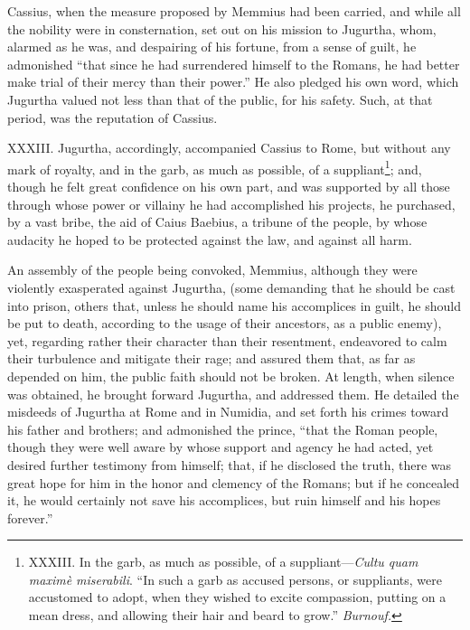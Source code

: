 Cassius, when the measure proposed by Memmius had been carried, and
while all the nobility were in consternation, set out on his mission
to Jugurtha, whom, alarmed as he was, and despairing of his fortune,
from a sense of guilt, he admonished ``that since he had surrendered
himself to the Romans, he had better make trial of their mercy than
their power.'' He also pledged his own word, which Jugurtha valued not
less than that of the public, for his safety. Such, at that period,
was the reputation of Cassius.

XXXIII. Jugurtha, accordingly, accompanied Cassius to Rome, but
without any mark of royalty, and in the garb, as much as possible, of
a suppliant\footnote{XXXIII. In the garb, as much as possible, of a suppliant—\emph{Cultu
quam maximè miserabili}. ``In such a garb as accused persons, or
suppliants, were accustomed to adopt, when they wished to excite
compassion, putting on a mean dress, and allowing their hair and beard
to grow.'' \emph{Burnouf.}}; and, though he felt great confidence on his own
part, and was supported by all those through whose power or villainy
he had accomplished his projects, he purchased, by a vast bribe, the
aid of Caius Baebius, a tribune of the people, by whose audacity he
hoped to be protected against the law, and against all harm.

An assembly of the people being convoked, Memmius, although they were
violently exasperated against Jugurtha, (some demanding that he should
be cast into prison, others that, unless he should name his
accomplices in guilt, he should be put to death, according to the
usage of their ancestors, as a public enemy), yet, regarding rather
their character than their resentment, endeavored to calm their
turbulence and mitigate their rage; and assured them that, as far as
depended on him, the public faith should not be broken. At length,
when silence was obtained, he brought forward Jugurtha, and addressed
them. He detailed the misdeeds of Jugurtha at Rome and in Numidia, and
set forth his crimes toward his father and brothers; and admonished
the prince, ``that the Roman people, though they were well aware by
whose support and agency he had acted, yet desired further testimony
from himself; that, if he disclosed the truth, there was great hope
for him in the honor and clemency of the Romans; but if he concealed
it, he would certainly not save his accomplices, but ruin himself and
his hopes forever.''

